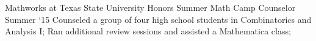 \experience
    {Mathworks at Texas State University}
    {Honors Summer Math Camp Counselor}
    {Summer `15}
    {
        Counseled a group of four high school students in Combinatorics and Analysis I;
        Ran additional review sessions and assisted a Mathematica class;
    }
